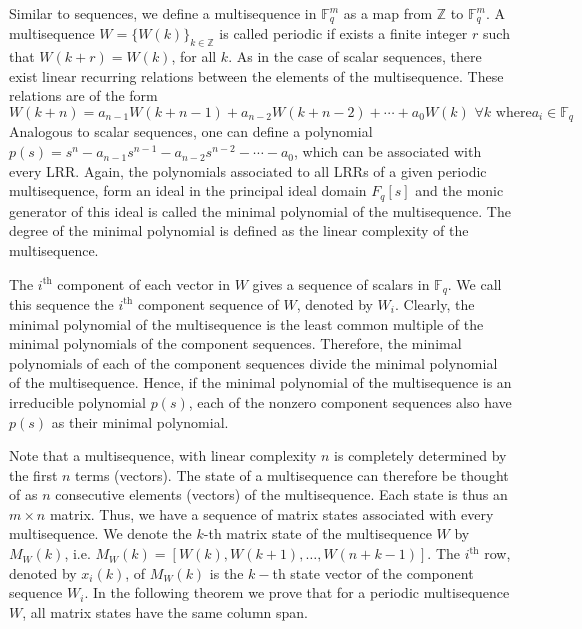 \documentclass[letterpaper, 12 pt]{article}  \usepackage{amssymb}
\newcommand{\F}{\mathbb{F}}
\begin{document}
Similar to sequences, we define a multisequence in $\F_q^m$ as a map from
$\mathbb{Z}$ to $\F_q^m$. 
 A multisequence $W = \{W(k)\}_{k \in \mathbb{Z}}$   is called
periodic if exists a finite
integer $r$ such that $W(k+r)   = W({k})$, for all $k$. As in the case
of scalar sequences, there exist linear  recurring relations between the
elements of the
multisequence. These relations are of the form
{\small
\begin{equation}
\label{veceq1}
W(k+n) = a_{n-1}W(k+n-1) + a_{n-2}W({k+n-2}) + \cdots + a_0W(k)\,\, \forall
k\textrm{ where
}
a_i \in \F_q
\end{equation}
}
 Analogous to scalar sequences, one can define
a polynomial $p(s) =  s^n - a_{n-1}s^{n-1} - a_{n-2}s^{n-2} - \cdots - a_0 $,
which can be associated with every LRR.
Again, the polynomials associated to all LRRs of a 
given periodic multisequence, form an ideal in the principal ideal domain
$F_q[s]$ and the monic
generator of this ideal is called the minimal polynomial of the multisequence.
The degree of the minimal polynomial is defined as the linear complexity of the
multisequence.    
      
  The $i^{\textrm{th}}$ component of each vector in $W$ gives a sequence of
scalars in $\F_q$. We call this sequence the
$i^{\textrm{th}}$ component sequence of $W$, denoted by $W_i$. Clearly, the
minimal polynomial of the multisequence is the least common multiple of the
minimal polynomials of the component sequences. Therefore, the minimal
polynomials of each of the component sequences divide the minimal polynomial of
the multisequence. Hence, if the minimal polynomial of the multisequence is an
irreducible polynomial $p(s)$, each of the nonzero component sequences also have
$p(s)$ as
their minimal polynomial.



Note that a multisequence, with linear complexity $n$ is completely determined
by the first $n$ terms (vectors).  The state of a multisequence can 
therefore be thought of as $n$ consecutive elements (vectors) of the 
multisequence. Each state is thus an $m\times n$ matrix.
 Thus, we have a sequence of  matrix states associated with every
multisequence. We denote the $k$-th matrix state of the multisequence $W$ by
$M_W(k)$, i.e. $M_W(k) = [W(k),W({k+1}),\ldots,W({n+k-1})]$. The
$i^{\textrm{th}}$ row, denoted by $x_i(k)$, of $M_W(k)$ is the $k-$th state
vector of the component sequence $W_i$. 
In the following theorem
we prove that for a periodic multisequence $W$, all matrix states have
the same column span.
\end{document}
